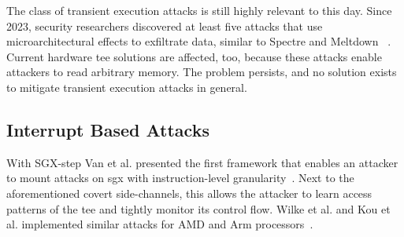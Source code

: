 

The class of transient execution attacks is still highly relevant to this day.
Since 2023, security researchers discovered at least five attacks that use
microarchitectural effects to exfiltrate data, similar to Spectre and Meltdown~
\cite{ormandy2023zenbleed,trujillo2023inception,
moghimi2023downfall,ragab_ghostrace_2024, wilke2024tdxdown}. Current hardware
\gls{tee} solutions are affected, too, because these attacks enable attackers to
read arbitrary memory. The problem persists, and no solution exists to mitigate
transient execution attacks in general.\\

\subsection{Interrupt Based Attacks}
\label{sec:20:interrupt_sca}
With SGX-step Van et al. presented the first framework that enables an attacker
to mount attacks on \gls{sgx} with instruction-level
granularity~\cite{van2017sgx}. Next to the aforementioned covert side-channels,
this allows the attacker to learn access patterns of the \gls{tee} and tightly
monitor its control flow. Wilke et al. and Kou et al. implemented similar
attacks for AMD and Arm processors~\cite{wilke2023sev, kou2021load}.\\

